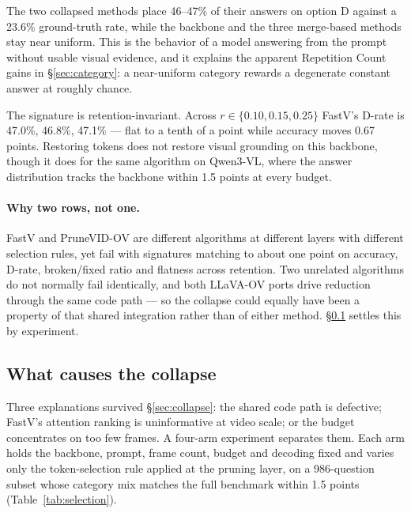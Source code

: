 \documentclass[11pt]{article}
\begin{document}
The two collapsed methods place 46--47\% of their answers on option D
against a 23.6\% ground-truth rate, while the backbone and the three
merge-based methods stay near uniform. This is the behavior of a model
answering from the prompt without usable visual evidence, and it explains
the apparent Repetition Count gains in \S\ref{sec:category}: a near-uniform
category rewards a degenerate constant answer at roughly chance.

The signature is retention-invariant. Across $r \in \{0.10, 0.15, 0.25\}$
FastV's D-rate is 47.0\%, 46.8\%, 47.1\% --- flat to a tenth of a point
while accuracy moves 0.67 points. Restoring tokens does not restore visual
grounding on this backbone, though it does for the same algorithm on
Qwen3-VL, where the answer distribution tracks the backbone within 1.5
points at every budget.

\paragraph{Why two rows, not one.} FastV and PruneVID-OV are different
algorithms at different layers with different selection rules, yet fail with
signatures matching to about one point on accuracy, D-rate, broken/fixed
ratio and flatness across retention. Two unrelated algorithms do not
normally fail identically, and both LLaVA-OV ports drive reduction through
the same code path --- so the collapse could equally have been a property of
that shared integration rather than of either method.
\S\ref{sec:selection} settles this by experiment.

\subsection{What causes the collapse}
\label{sec:selection}

Three explanations survived \S\ref{sec:collapse}: the shared code path is
defective; FastV's attention ranking is uninformative at video scale; or the
budget concentrates on too few frames. A four-arm experiment separates them.
Each arm holds the backbone, prompt, frame count, budget and decoding fixed
and varies only the token-selection rule applied at the pruning layer, on a
986-question subset whose category mix matches the full benchmark within 1.5
points (Table~\ref{tab:selection}).
\end{document}
